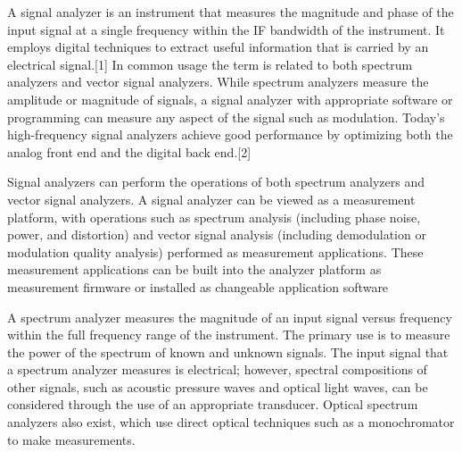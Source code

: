 	A signal analyzer is an instrument that measures the magnitude and phase of the input signal at a single frequency within the IF bandwidth of the instrument. It employs digital techniques to extract useful information that is carried by an electrical signal.[1] In common usage the term is related to both spectrum analyzers and vector signal analyzers. While spectrum analyzers measure the amplitude or magnitude of signals, a signal analyzer with appropriate software or programming can measure any aspect of the signal such as modulation. Today’s high-frequency signal analyzers achieve good performance by optimizing both the analog front end and the digital back end.[2]


Signal analyzers can perform the operations of both spectrum analyzers and vector signal analyzers. A signal analyzer can be viewed as a measurement platform, with operations such as spectrum analysis (including phase noise, power, and distortion) and vector signal analysis (including demodulation or modulation quality analysis) performed as measurement applications. These measurement applications can be built into the analyzer platform as measurement firmware or installed as changeable application software

	A spectrum analyzer measures the magnitude of an input signal versus frequency within the full frequency range of the instrument. The primary use is to measure the power of the spectrum of known and unknown signals. The input signal that a spectrum analyzer measures is electrical; however, spectral compositions of other signals, such as acoustic pressure waves and optical light waves, can be considered through the use of an appropriate transducer. Optical spectrum analyzers also exist, which use direct optical techniques such as a monochromator to make measurements.

